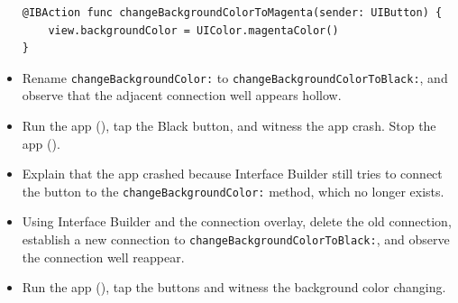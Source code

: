 \documentclass[a4paper,11pt]{scrartcl}
\begin{document}
\begin{itemize}
\begin{lstlisting}
@IBAction func changeBackgroundColorToMagenta(sender: UIButton) {
	view.backgroundColor = UIColor.magentaColor()
}
\end{lstlisting}
\item Rename \texttt{changeBackgroundColor:} to \texttt{changeBackgroundColorToBlack:}, and observe that the adjacent connection well appears hollow.
\item Run the app (), tap the Black button, and witness the app crash. Stop the app ().
\item Explain that the app crashed because Interface Builder still tries to connect the button to the \texttt{changeBackgroundColor:} method, which no longer exists.
\item Using Interface Builder and the connection overlay, delete the old connection, establish a new connection to \texttt{changeBackgroundColorToBlack:}, and observe the connection well reappear.
\item Run the app (), tap the buttons and witness the background color changing.
\end{itemize}
\end{document}
